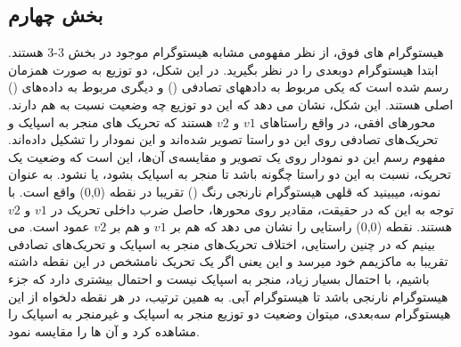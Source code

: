 \documentclass[12pt,onecolumn,a4paper,fleqn]{article}
\begin{document}
\subsection{بخش چهارم}

 \begin{figure}[ht]
	\centering
\end{figure}

هیستوگرام های فوق، از نظر مفهومی مشابه هیستوگرام موجود در بخش 3-3 هستند. ابتدا هیستوگرام دوبعدی را در نظر بگیرید. در این شکل، دو توزیع به صورت همزمان رسم شده است که یکی مربوط به دادههای تصادفی () و دیگری مربوط به داده‌های () اصلی هستند. این شکل، نشان می دهد که این دو توزیع چه وضعیت نسبت به هم دارند. محورهای افقی، در واقع راستاهای $ v1 $ و $ v2 $ هستند که تحریک های منجر به اسپایک و تحریک‌های تصادفی روی این دو راستا تصویر شده‌اند و این نمودار را تشکیل داده‌اند. مفهوم رسم این دو نمودار روی یک تصویر و مقایسه‌ی آن‌ها، این است که وضعیت یک تحریک، نسبت به این دو راستا چگونه باشد تا منجر به اسپایک بشود، یا نشود. به عنوان نمونه، میبینید که قلهی هیستوگرام نارنجی رنگ () تقریبا در نقطه (0,0) واقع است. با توجه به این که در حقیقت، مقادیر روی محورها، حاصل ضرب داخلی تحریک در $ v1 $ و $ v2 $ هستند. نقطه (0,0) راستایی را نشان می دهد که هم بر $ v1 $ و هم بر $ v2 $ عمود است. می بینیم که در چنین راستایی، اختلاف تحریک‌های منجر به اسپایک و تحریک‌های تصادفی تقریبا به ماکزیمم خود میرسد و این یعنی اگر یک تحریک نامشخص در این نقطه داشته باشیم، با احتمال بسیار زیاد، منجر به اسپایک نیست و احتمال بیشتری دارد که جزء هیستوگرام نارنجی باشد تا هیستوگرام آبی. به همین ترتیب، در هر نقطه دلخواه از این هیستوگرام سه‌بعدی، میتوان وضعیت دو توزیع منجر به اسپایک و غیرمنجر به اسپایک را مشاهده کرد و آن ها را مقایسه نمود.
\end{document}

